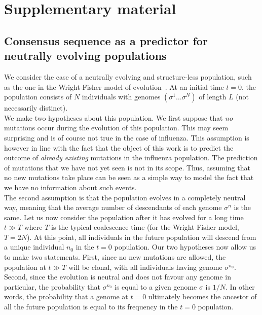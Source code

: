 \documentclass[reprint,amsmath,amssymb,superscriptaddress,showpacs,rmp]{revtex4-1}
\begin{document}
\section*{Supplementary material} %
\label{sec:supplementary_material}

\subsection{Consensus sequence as a predictor for neutrally evolving populations} %
\label{sub:consensus_sequence_as_a_predictor}

	We consider the case of a neutrally evolving and structure-less population, such as the one in the Wright-Fisher model of evolution~\cite{10.1080/10635150500354860}. At an initial time $t=0$, the population consists of $N$ individuals with genomes $(\sigma^1\ldots\sigma^N)$ of length $L$ (not necessarily distinct). \\
	We make two hypotheses about this population. We first suppose that \emph{no} mutations occur during the evolution of this population. This may seem surprising and is of course not true in the case of influenza. This assumption is however in line with the fact that the object of this work is to predict the outcome of \emph{already existing} mutations in the influenza population. The prediction of mutations that we have not yet seen is not in its scope. Thus, assuming that no new mutations take place can be seen as a simple way to model the fact that we have no information about such events. \\
	The second assumption is that the population evolves in a completely neutral way, meaning that the average number of descendants of each genome $\sigma^n$ is the same. Let us now consider the population after it has evolved for a long time $t\gg T$ where $T$ is the typical coalescence time (for the Wright-Fisher model, $T=2N$). At this point, all individuals in the future population will descend from a unique individual $n_0$ in the $t=0$ population. Our two hypotheses now allow us to make two statements. First, since no new mutations are allowed, the population at $t\gg T$ will be clonal, with all individuals having genome $\sigma^{n_0}$. Second, since the evolution is neutral and does not favour any genome in particular, the probability that $\sigma^{n_0}$ is equal to a given genome $\sigma$ is $1/N$. In other words, the probability that a genome at $t=0$ ultimately becomes the ancestor of all the future population is equal to its frequency in the $t=0$ population. \\
\end{document}
